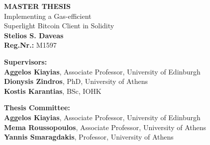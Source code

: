 \begin{center}
\begin{normalsize}
    \vspace{3cm}
    \textbf{MASTER THESIS}\\
    \vspace{3cm}
    Implementing a Gas-efficient\\
    Superlight Bitcoin Client in Solidity\\
    \vspace{3cm}
    \textbf{Stelios S. Daveas}\\
    \textbf{Reg.Nr.:} M1597

    \vspace{5cm}
    \begin{flushleft}
        \textbf{Supervisors:}\\
        \hspace{1.5cm}
        \textbf{Aggelos Kiayias}, Associate Professor, University of Edinburgh\\
        \hspace{1.5cm}
        \textbf{Dionysis Zindros}, PhD, University of Athens\\
        \hspace{1.5cm}
        \textbf{Kostis Karantias}, BSc, IOHK

        \vspace{1cm}

        \textbf{Thesis Committee:}\\
        \hspace{1.5cm}
        \textbf{Aggelos Kiayias}, Associate Professor, University of Edinburgh\\
        \hspace{1.5cm}
        \textbf{Mema Roussopoulos}, Associate Professor, University of Athens\\
        \hspace{1.5cm}
        \textbf{Yannis Smaragdakis}, Professor, University of Athens

    \end{flushleft}
\end{normalsize}
\end{center}
\pagebreak
